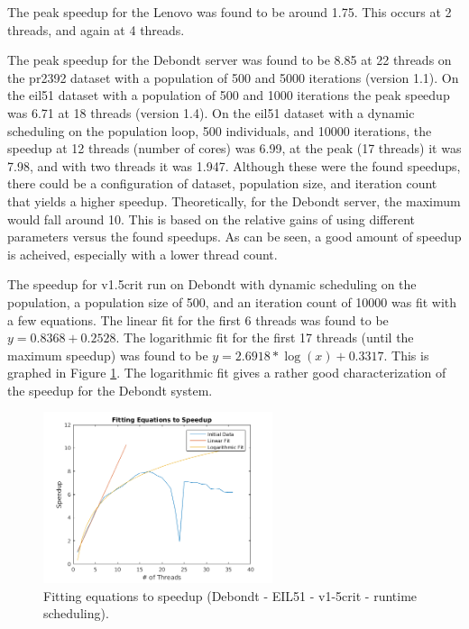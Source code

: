 \documentclass[10pt,letterpaper]{article}
\begin{document}
The peak speedup for the Lenovo was found to be around 1.75. This occurs at 2 threads, and again at 4 threads. 

The peak speedup for the Debondt server was found to be 8.85 at 22 threads on the pr2392 dataset with a population of 500 and 5000 iterations (version 1.1). On the eil51 dataset with a population of 500 and 1000 iterations the peak speedup was 6.71 at 18 threads (version 1.4). On the eil51 dataset with a dynamic scheduling on the population loop, 500 individuals, and 10000 iterations, the speedup at 12 threads (number of cores) was 6.99, at the peak (17 threads) it was 7.98, and with two threads it was 1.947. Although these were the found speedups, there could be a configuration of dataset, population size, and iteration count that yields a higher speedup. Theoretically, for the Debondt server, the maximum would fall around 10. This is based on the relative gains of using different parameters versus the found speedups. As can be seen, a good amount of speedup is acheived, especially with a lower thread count. 

The speedup for v1.5crit run on Debondt with dynamic scheduling on the population, a population size of 500, and an iteration count of 10000 was fit with a few equations. The linear fit for the first 6 threads was found to be $ y = 0.8368 + 0.2528 $. The logarithmic fit for the first 17 threads (until the maximum speedup) was found to be $y = 2.6918*\log(x) + 0.3317$. This is graphed in Figure \ref{fig:linefits}. The logarithmic fit gives a rather good characterization of the speedup for the Debondt system.

\begin{figure}
\centering
\includegraphics[width=0.6\textwidth]{../img/Debondt_fitting_v1-5crit_runtimepop.png} 
\caption{Fitting equations to speedup (Debondt - EIL51 - v1-5crit - runtime scheduling).}
\label{fig:linefits}
\end{figure}
\end{document}
